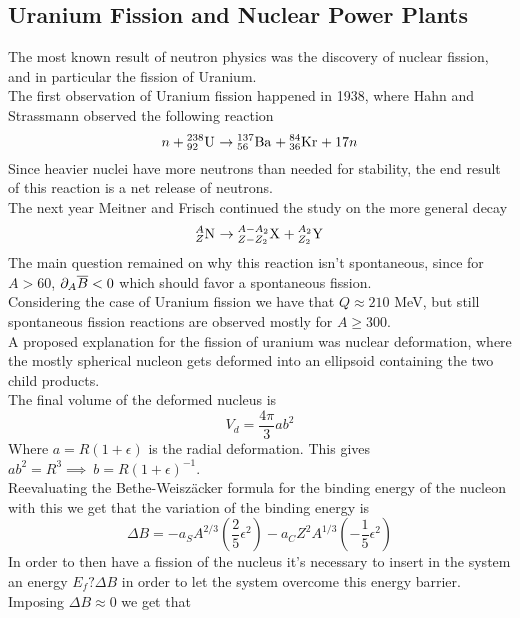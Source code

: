 \documentclass[../qm.tex]{subfiles}
\begin{document}
\subsection{Uranium Fission and Nuclear Power Plants}
The most known result of neutron physics was the discovery of nuclear fission, and in particular the fission of Uranium.\\
The first observation of Uranium fission happened in 1938, where Hahn and Strassmann observed the following reaction
\begin{equation*}
	n+\nuc{U}{238}{92}\to\nuc{Ba}{137}{56}+\nuc{Kr}{84}{36}+17n
\end{equation*}
Since heavier nuclei have more neutrons than needed for stability, the end result of this reaction is a net release of neutrons.\\
The next year Meitner and Frisch continued the study on the more general decay
\begin{equation*}
	\nuc{N}{A}{Z}\to\nuc{X}{A-A_2}{Z-Z_2}+\nuc{Y}{A_2}{Z_2}
\end{equation*}
The main question remained on why this reaction isn't spontaneous, since for $A>60$, $\del_A\overline{B}<0$ which should favor a spontaneous fission.\\
Considering the case of Uranium fission we have that $Q\approx210$ MeV, but still spontaneous fission reactions are observed mostly for $A\ge300$.\\
A proposed explanation for the fission of uranium was nuclear deformation, where the mostly spherical nucleon gets deformed into an ellipsoid containing the two child products.\\
The final volume of the deformed nucleus is
\begin{equation*}
	V_d=\frac{4\pi}{3}ab^2
\end{equation*}
Where $a=R(1+\epsilon)$ is the radial deformation. This gives $ab^2=R^3\implies\ b=R(1+\epsilon)^{-1}$.\\
Reevaluating the Bethe-Weiszäcker formula for the binding energy of the nucleon with this we get that the variation of the binding energy is
\begin{equation*}
	\Delta B=-a_SA^{2/3}\left( \frac{2}{5}\epsilon^2 \right)-a_CZ^2A^{1/3}\left( -\frac{1}{5}\epsilon^2 \right)
\end{equation*}
In order to then have a fission of the nucleus it's necessary to insert in the system an energy $E_f?\Delta B$ in order to let the system overcome this energy barrier.\\
Imposing $\Delta B\approx0$ we get that
\end{document}
